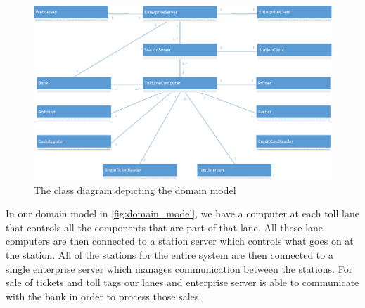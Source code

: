 \begin{figure}[H]
\centering
\includegraphics[width=1\textwidth]{img/domain_model/domain_model}
\caption{The class diagram depicting the domain model}
\label{fig:domain_model}
\end{figure}

In our domain model in {\autoref{fig:domain_model}}, we have a computer at each toll lane that controls all the components that are part of that lane. All these lane computers are then connected to a station server which controls what goes on at the station. All of the stations for the entire system are then connected to a single enterprise server which manages communication between the stations. For sale of tickets and toll tags our lanes and enterprise server is able to communicate with the bank in order to process those sales.